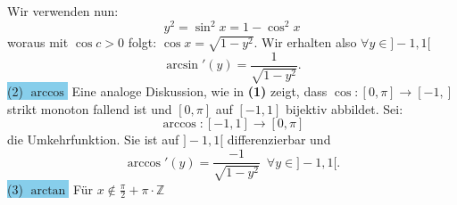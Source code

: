 \documentclass[landscape, 10pt]{article}
\begin{document}
\begin{multicols}{3}
                            Wir verwenden nun: 
                            \begin{equation*}
                                   y^2=\sin^2x=1-\cos^2x
                            \end{equation*}
                            woraus mit 
                            \textcolor{NavyBlue}{
                            $\cos c>0$} folgt:
                            \textcolor{NavyBlue}{
                            $\cos x=\sqrt{1-y^2}$}. 
                            Wir erhalten also 
                            \textcolor{NavyBlue}{
                            $\forall y\in ]-1,1[$}
                            \begin{equation*}
                                   \arcsin'(y)
                                   =\frac{1}{\sqrt{1-y^2}}.
                            \end{equation*}
                     \colorbox{SkyBlue}{(2) $\arccos$}
                            Eine analoge Diskussion, wie in 
                            \textbf{(1)} zeigt, dass
                            \textcolor{NavyBlue}{
                            $\cos:[0,\pi]\longrightarrow[-1,]$}
                            strikt monoton fallend ist
                            und 
                            \textcolor{NavyBlue}{
                            $[0,\pi]$} auf 
                            \textcolor{NavyBlue}{
                            $[-1,1]$}
                            bijektiv abbildet. Sei:
                            \begin{equation*}
                                  \arccos:[-1,1]
                                   \longrightarrow[0,\pi] 
                            \end{equation*}
                            die Umkehrfunktion. Sie ist auf 
                            \textcolor{NavyBlue}{
                            $]-1,1[$}
                            differenzierbar und
                            \begin{equation*}
                                  \arccos'(y)
                                   =\frac{-1}{\sqrt{1-y^2}}
                                   \enspace
                                   \forall y\in]-1,1[.
                            \end{equation*}
                     \colorbox{SkyBlue}{(3) $\arctan$}
                            Für 
                            \textcolor{NavyBlue}{
                            $x\notin\frac{\pi}{2}
                            +\pi\cdot\mathbb{Z}$}

\end{multicols}
\end{document}
